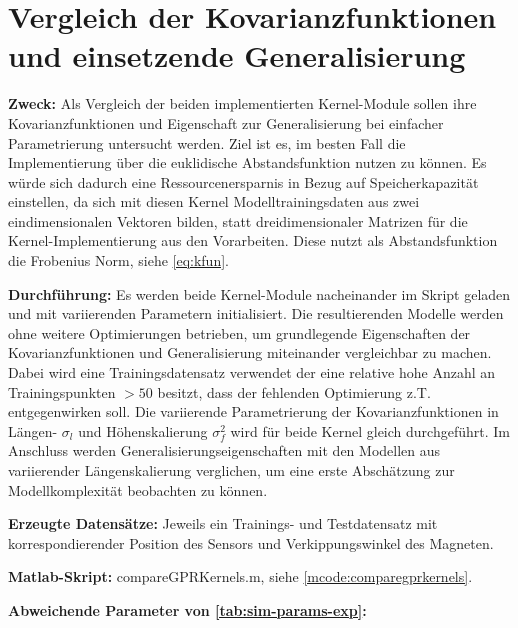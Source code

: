 %

\section{Vergleich der Kovarianzfunktionen und einsetzende Generalisierung}\label{sec:exp1}

\textbf{Zweck:} Als Vergleich der beiden implementierten Kernel-Module sollen ihre Kovarianzfunktionen und Eigenschaft zur Generalisierung bei einfacher Parametrierung untersucht werden. Ziel ist es, im besten Fall die Implementierung über die euklidische Abstandsfunktion nutzen zu können. Es würde sich dadurch eine Ressourcenersparnis in Bezug auf Speicherkapazität einstellen, da sich mit diesen Kernel Modelltrainingsdaten aus zwei eindimensionalen Vektoren bilden, statt dreidimensionaler Matrizen für die Kernel-Implementierung aus den Vorarbeiten. Diese nutzt als Abstandsfunktion die Frobenius Norm, siehe \autoref{eq:kfun}.


\clearpage


\textbf{Durchführung:} Es werden beide Kernel-Module nacheinander im Skript geladen und mit variierenden Parametern initialisiert. Die resultierenden Modelle werden ohne weitere Optimierungen betrieben, um grundlegende Eigenschaften der Kovarianzfunktionen und Generalisierung miteinander vergleichbar zu machen. Dabei wird eine Trainingsdatensatz verwendet der eine relative hohe Anzahl an Trainingspunkten $>50$ besitzt, dass der fehlenden Optimierung z.T. entgegenwirken soll. Die variierende Parametrierung der Kovarianzfunktionen in Längen- $\sigma_l$ und Höhenskalierung $\sigma_f^2$ wird für beide Kernel gleich durchgeführt. Im Anschluss werden Generalisierungseigenschaften mit den Modellen aus variierender Längenskalierung verglichen, um eine erste Abschätzung zur Modellkomplexität beobachten zu können.

\textbf{Erzeugte Datensätze:} Jeweils ein Trainings- und Testdatensatz mit korrespondierender Position des Sensors und Verkippungswinkel des Magneten.

\textbf{Matlab-Skript:} compareGPRKernels.m, siehe \autoref{mcode:comparegprkernels}.

\textbf{Abweichende Parameter von \autoref{tab:sim-params-exp}:}

